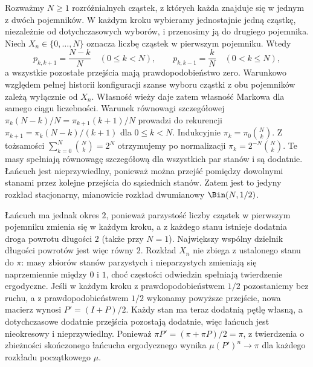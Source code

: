 \begin{przyklad}
Rozważmy $N\geq1$ rozróżnialnych cząstek,
z których każda znajduje się w jednym z dwóch
pojemników. W każdym kroku wybieramy jednostajnie
jedną cząstkę, niezależnie od dotychczasowych
wyborów, i przenosimy ją do drugiego pojemnika.
Niech $X_n\in\{0,\ldots,N\}$ oznacza liczbę
cząstek w pierwszym pojemniku. Wtedy
\[
p_{k,k+1}=\frac{N-k}{N}\quad(0\leq k<N),\qquad
p_{k,k-1}=\frac{k}{N}\quad(0<k\leq N),
\]
a wszystkie pozostałe przejścia mają
prawdopodobieństwo zero. Warunkowo względem
pełnej historii konfiguracji szanse wyboru cząstki
z obu pojemników zależą wyłącznie od $X_n$.
Własność wieży daje zatem własność Markowa
dla samego ciągu liczebności.
Warunek równowagi szczegółowej
$\pi_k(N-k)/N=\pi_{k+1}(k+1)/N$
prowadzi do rekurencji
$\pi_{k+1}=\pi_k(N-k)/(k+1)$ dla $0\leq k<N$.
Indukcyjnie $\pi_k=\pi_0\binom Nk$.
Z tożsamości $\sum_{k=0}^N\binom Nk=2^N$
otrzymujemy po normalizacji
$\pi_k=2^{-N}\binom Nk$.
Te masy spełniają równowagę szczegółową
dla wszystkich par stanów i są dodatnie.
Łańcuch jest nieprzywiedlny, ponieważ można
przejść pomiędzy dowolnymi stanami przez
kolejne przejścia do sąsiednich stanów.
Zatem jest to jedyny rozkład stacjonarny,
mianowicie rozkład dwumianowy $\Bin(N,1/2)$.

Łańcuch ma jednak okres $2$, ponieważ parzystość
liczby cząstek w pierwszym pojemniku zmienia się
w każdym kroku, a z każdego stanu istnieje
dodatnia droga powrotu długości $2$ (także
przy $N=1$). Największy wspólny dzielnik
długości powrotów jest więc równy $2$.
Rozkład $X_n$ nie zbiega z ustalonego stanu
do $\pi$: masy zbiorów stanów parzystych
i nieparzystych zmieniają się naprzemiennie
między $0$ i $1$, choć częstości odwiedzin
spełniają twierdzenie ergodyczne. Jeśli w każdym
kroku z prawdopodobieństwem $1/2$ pozostaniemy
bez ruchu, a z prawdopodobieństwem $1/2$ wykonamy
powyższe przejście, nowa macierz wynosi
$P'=(I+P)/2$. Każdy stan ma teraz dodatnią
pętlę własną, a dotychczasowe dodatnie
przejścia pozostają dodatnie, więc łańcuch
jest nieokresowy i nieprzywiedlny.
Ponieważ $\pi P'=(\pi+\pi P)/2=\pi$,
z twierdzenia o zbieżności skończonego łańcucha
ergodycznego wynika $\mu(P')^n\to\pi$ dla każdego
rozkładu początkowego $\mu$.
\end{przyklad}

